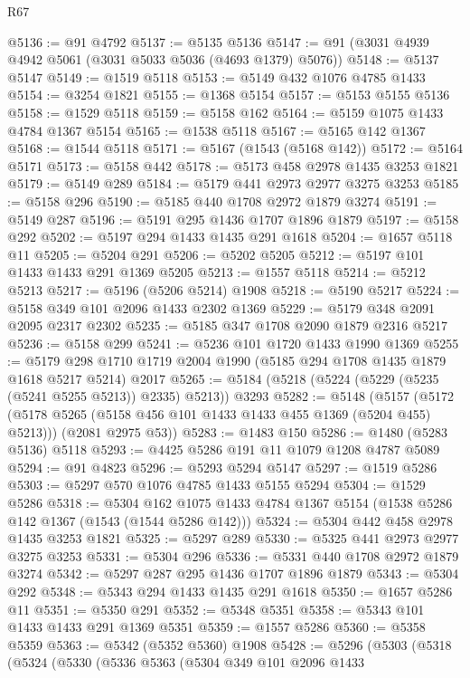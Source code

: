 \begin{lexlean}{R67}
\begin{coremodule}
@5136 := @91 @4792
@5137 := @5135 @5136
@5147 := @91 (@3031 @4939 @4942 @5061 (@3031 @5033 @5036 (@4693 @1379) @5076))
@5148 := @5137 @5147
@5149 := @1519 @5118
@5153 := @5149 @432 @1076 @4785 @1433
@5154 := @3254 @1821
@5155 := @1368 @5154
@5157 := @5153 @5155 @5136
@5158 := @1529 @5118
@5159 := @5158 @162
@5164 := @5159 @1075 @1433 @4784 @1367 @5154
@5165 := @1538 @5118
@5167 := @5165 @142 @1367
@5168 := @1544 @5118
@5171 := @5167 (@1543 (@5168 @142))
@5172 := @5164 @5171
@5173 := @5158 @442
@5178 := @5173 @458 @2978 @1435 @3253 @1821
@5179 := @5149 @289
@5184 := @5179 @441 @2973 @2977 @3275 @3253
@5185 := @5158 @296
@5190 := @5185 @440 @1708 @2972 @1879 @3274
@5191 := @5149 @287
@5196 := @5191 @295 @1436 @1707 @1896 @1879
@5197 := @5158 @292
@5202 := @5197 @294 @1433 @1435 @291 @1618
@5204 := @1657 @5118 @11
@5205 := @5204 @291
@5206 := @5202 @5205
@5212 := @5197 @101 @1433 @1433 @291 @1369 @5205
@5213 := @1557 @5118
@5214 := @5212 @5213
@5217 := @5196 (@5206 @5214) @1908
@5218 := @5190 @5217
@5224 := @5158 @349 @101 @2096 @1433 @2302 @1369
@5229 := @5179 @348 @2091 @2095 @2317 @2302
@5235 := @5185 @347 @1708 @2090 @1879 @2316 @5217
@5236 := @5158 @299
@5241 := @5236 @101 @1720 @1433 @1990 @1369
@5255 := @5179 @298 @1710 @1719 @2004 @1990 (@5185 @294 @1708 @1435 @1879 @1618 @5217 @5214) @2017
@5265 := @5184 (@5218 (@5224 (@5229 (@5235 (@5241 @5255 @5213)) @2335) @5213)) @3293
@5282 := @5148
    (@5157
      (@5172 (@5178 @5265 (@5158 @456 @101 @1433 @1433 @455 @1369 (@5204 @455) @5213)))
      (@2081 @2975 @53))
@5283 := @1483 @150
@5286 := @1480 (@5283 @5136) @5118
@5293 := @4425 @5286 @191 @11 @1079 @1208 @4787 @5089
@5294 := @91 @4823
@5296 := @5293 @5294 @5147
@5297 := @1519 @5286
@5303 := @5297 @570 @1076 @4785 @1433 @5155 @5294
@5304 := @1529 @5286
@5318 := @5304
    @162
    @1075
    @1433
    @4784
    @1367
    @5154
    (@1538 @5286 @142 @1367 (@1543 (@1544 @5286 @142)))
@5324 := @5304 @442 @458 @2978 @1435 @3253 @1821
@5325 := @5297 @289
@5330 := @5325 @441 @2973 @2977 @3275 @3253
@5331 := @5304 @296
@5336 := @5331 @440 @1708 @2972 @1879 @3274
@5342 := @5297 @287 @295 @1436 @1707 @1896 @1879
@5343 := @5304 @292
@5348 := @5343 @294 @1433 @1435 @291 @1618
@5350 := @1657 @5286 @11
@5351 := @5350 @291
@5352 := @5348 @5351
@5358 := @5343 @101 @1433 @1433 @291 @1369 @5351
@5359 := @1557 @5286
@5360 := @5358 @5359
@5363 := @5342 (@5352 @5360) @1908
@5428 := @5296
    (@5303
      (@5318
        (@5324
          (@5330
            (@5336
              @5363
              (@5304
                @349
                @101
                @2096
                @1433

\end{coremodule}
\end{lexlean}
